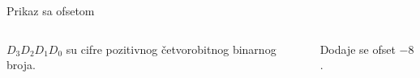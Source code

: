 \begin{frame}[label=04-s030]{Prikaz sa ofsetom}
\begin{columns}[c,onlytextwidth]
\centering
{\fontsize{9}{10}\selectfont\renewcommand{\arraystretch}{.82}\setlength{\tabcolsep}{4pt}\par}
$D_3D_2D_1D_0$ su cifre pozitivnog četvorobitnog binarnog broja.
\par\vspace{4mm}
Dodaje se \alert{ofset $-8$}.
\end{columns}
\end{frame}

